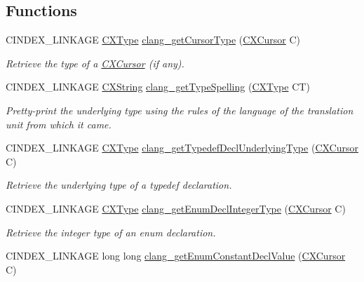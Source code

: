\subsection*{Functions}
\begin{DoxyCompactItemize}
\item 
\mbox{\label{group__CINDEX__TYPES_gaae5702661bb1f2f93038051737de20f4}} 
C\+I\+N\+D\+E\+X\+\_\+\+L\+I\+N\+K\+A\+GE \hyperlink{structCXType}{C\+X\+Type} \hyperlink{group__CINDEX__TYPES_gaae5702661bb1f2f93038051737de20f4}{clang\+\_\+get\+Cursor\+Type} (\hyperlink{structCXCursor}{C\+X\+Cursor} C)
\begin{DoxyCompactList}\small\item\em Retrieve the type of a \hyperlink{structCXCursor}{C\+X\+Cursor} (if any). \end{DoxyCompactList}\item 
C\+I\+N\+D\+E\+X\+\_\+\+L\+I\+N\+K\+A\+GE \hyperlink{structCXString}{C\+X\+String} \hyperlink{group__CINDEX__TYPES_gac9d37f61bede521d4f42a6553bcbc09f}{clang\+\_\+get\+Type\+Spelling} (\hyperlink{structCXType}{C\+X\+Type} CT)
\begin{DoxyCompactList}\small\item\em Pretty-\/print the underlying type using the rules of the language of the translation unit from which it came. \end{DoxyCompactList}\item 
C\+I\+N\+D\+E\+X\+\_\+\+L\+I\+N\+K\+A\+GE \hyperlink{structCXType}{C\+X\+Type} \hyperlink{group__CINDEX__TYPES_ga8de899fc18dc859b6fe3b97309f4fd52}{clang\+\_\+get\+Typedef\+Decl\+Underlying\+Type} (\hyperlink{structCXCursor}{C\+X\+Cursor} C)
\begin{DoxyCompactList}\small\item\em Retrieve the underlying type of a typedef declaration. \end{DoxyCompactList}\item 
C\+I\+N\+D\+E\+X\+\_\+\+L\+I\+N\+K\+A\+GE \hyperlink{structCXType}{C\+X\+Type} \hyperlink{group__CINDEX__TYPES_ga0f5f950bee4e1828b51a41f0eaa951c4}{clang\+\_\+get\+Enum\+Decl\+Integer\+Type} (\hyperlink{structCXCursor}{C\+X\+Cursor} C)
\begin{DoxyCompactList}\small\item\em Retrieve the integer type of an enum declaration. \end{DoxyCompactList}\item 
C\+I\+N\+D\+E\+X\+\_\+\+L\+I\+N\+K\+A\+GE long long \hyperlink{group__CINDEX__TYPES_ga6b8585818420e7512feb4c9d209b4f4d}{clang\+\_\+get\+Enum\+Constant\+Decl\+Value} (\hyperlink{structCXCursor}{C\+X\+Cursor} C)

\end{DoxyCompactItemize}
